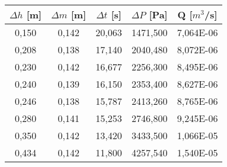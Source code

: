 \begin{center}
    
    \begin{tabular}{| c | c | c | c | c |}
        \hline
        $\Delta h$ [m]  & $\Delta m$ [m]    & $\Delta t$ [s]    & $\Delta P$ [Pa]    & Q [$m^3$/s]      \\ \hline
        0,150           & 0,142             & 20,063            & 1471,500           & 7,064E-06        \\ \hline
        0,208           & 0,138             & 17,140            & 2040,480           & 8,072E-06         \\ \hline
        0,230           & 0,142             & 16,677            & 2256,300           & 8,495E-06         \\ \hline
        0,240           & 0,139             & 16,150            & 2353,400           & 8,627E-06         \\ \hline 
        0,246           & 0,138             & 15,787            & 2413,260           & 8,765E-06         \\ \hline
        0,280           & 0,141             & 15,253            & 2746,800           & 9,245E-06         \\ \hline
        0,350           & 0,142             & 13,420            & 3433,500           & 1,066E-05         \\ \hline
        0,434           & 0,142             & 11,800            & 4257,540           & 1,540E-05         \\ \hline
    \end{tabular}
\end{center}

